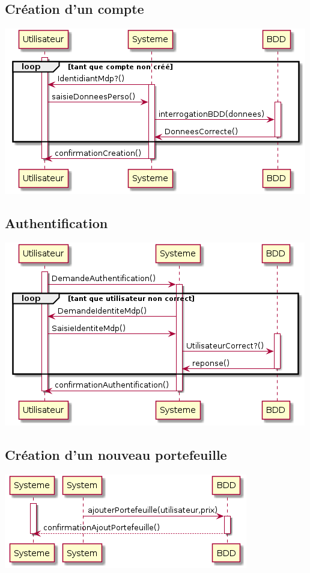 \subsection{Création d'un compte}
\includegraphics[scale=0.5]{../graph/DiagrammeSequenceCreationCompte.png} \\

\subsection{Authentification}
\includegraphics[scale=0.5]{../graph/DiagrammeSequenceAuthentification.png} \\

\subsection{Création d'un nouveau portefeuille}
\includegraphics[scale=0.5]{../graph/DiagrammeSequenceCreationPortefeuille.png} \\

